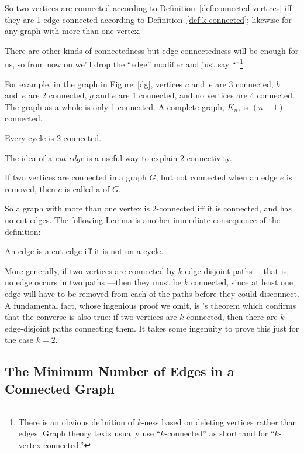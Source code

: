 So two vertices are connected according to
Definition~\ref{def:connected-vertices} iff they are 1-edge connected
according to Definition~\ref{def:k-connected}; likewise for any graph
with more than one vertex.

There are other kinds of connectedness but edge-connectedness will be
enough for us, so from now on we'll drop the ``edge'' modifier and
just say ``.''\footnote{There is an obvious definition
  of $k$-ness based on
  deleting vertices rather than edges.  Graph theory texts usually use
  ``$k$-connected'' as shorthand for ``$k$-vertex connected.''}

For example, in the graph in Figure~\ref{dg}, vertices $c$ and~$e$ are
3 connected, $b$ and~$e$ are 2 connected, $g$ and $e$ are 1 connected,
and no vertices are 4 connected.  The graph as a whole is only 1
connected.  A complete graph, $K_n$, is $(n-1)$ connected.
\begin{editingnotes}
\end{editingnotes}
Every cycle is 2-connected.

The idea of a \emph{cut edge} is a useful way to explain 2-connectivity.
\begin{definition}
If two vertices are connected in a graph $G$, but not connected when
an edge $e$ is removed, then $e$ is called a  of $G$.
\end{definition}
So a graph with more than one vertex is 2-connected iff it is
connected, and has no cut edges.  The following Lemma is
another immediate consequence of the definition:
\begin{lemma}\label{lem:cutiffcycle}
An edge is a cut edge iff it is not on a cycle.
\end{lemma}

More generally, if two vertices are connected by $k$ edge-disjoint
paths ---that is, no edge occurs in two paths ---then they must
be $k$ connected, since at least one edge will have to be removed from
each of the paths before they could disconnect.  A fundamental fact,
whose ingenious proof we omit, is 's theorem which
confirms that the converse is also true: if two vertices are
$k$-connected, then there are $k$ edge-disjoint paths connecting them.
It takes some ingenuity to prove this just for the case $k=2$.

\subsection{The Minimum Number of Edges in a Connected Graph}

